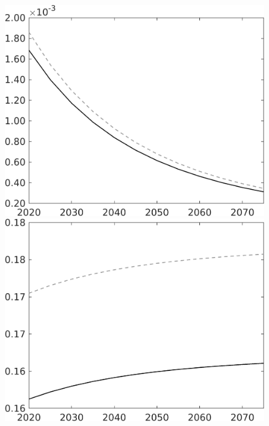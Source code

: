 \documentclass[12pt]{article}
\begin{document}
\begin{figure}[h!!]
\begin{minipage}[]{0.32\textwidth}
	\end{minipage}	
	\begin{minipage}[]{0.32\textwidth}
		\includegraphics[width=1\textwidth]{../../codding_model/own_basedOnFried/optimalPol_010922_revision/figures/all_13Sept22/CompTaul_Equlab_LFBAU_Reg0_Lg_spillover0_nsk0_xgr0_knspil1_sep1_countec0_GovRev0_etaa0.79_lgd0.png}
	\end{minipage}	
	\begin{minipage}[]{0.32\textwidth}
		\includegraphics[width=1\textwidth]{../../codding_model/own_basedOnFried/optimalPol_010922_revision/figures/all_13Sept22/CompTaul_Equlab_LFBAU_Reg0_Ln_spillover0_nsk0_xgr0_knspil1_sep1_countec0_GovRev0_etaa0.79_lgd0.png}
	\end{minipage}	
\end{figure}
\end{document}
